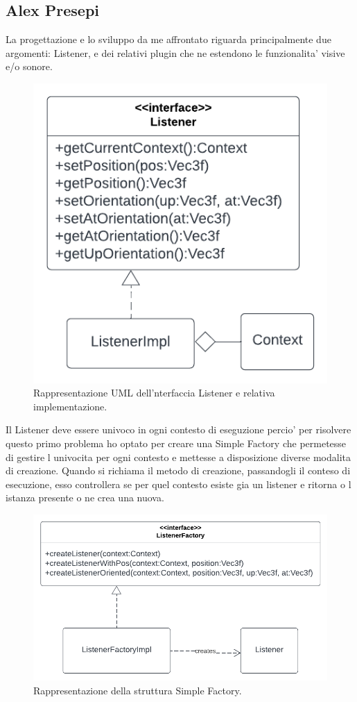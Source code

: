 \documentclass[a4paper,12pt]{report}
\begin{document}
\subsection*{Alex Presepi}
La progettazione e lo sviluppo da me affrontato riguarda principalmente due argomenti: Listener, e dei relativi plugin 
che ne estendono le funzionalita' visive e/o sonore.
\begin{figure}[H]
\centering{}
\includegraphics[width=\textwidth]{img/listener/Listener.png}
\caption{Rappresentazione UML dell'nterfaccia Listener e relativa implementazione.}
\label{img:Listener}
\end{figure}
%
Il Listener deve essere univoco in ogni contesto di eseguzione percio' per risolvere questo primo problema ho optato per creare una Simple Factory che permetesse di gestire l univocita per ogni contesto e mettesse a disposizione diverse modalita di creazione. Quando si richiama il metodo di creazione, 
passandogli il conteso di esecuzione, esso controllera se per quel contesto esiste gia un listener e ritorna o l istanza presente o ne crea una nuova. 
\begin{figure}[H]
\centering{}
\includegraphics[width=\textwidth]{img/listener/ListenerFactory.png}
\caption{Rappresentazione della struttura Simple Factory.}
\label{img:Listener}
\end{figure}
\end{document}
